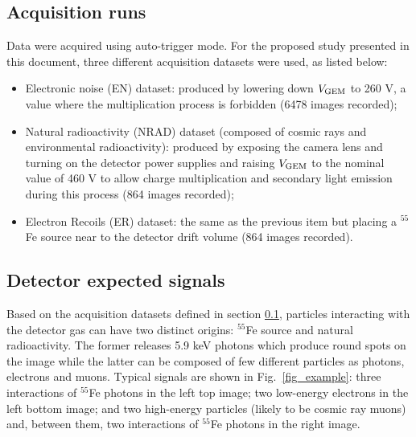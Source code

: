 \documentclass[a4paper,11pt]{article}
\begin{document}


\subsection{Acquisition runs}
\label{sec:acrRuns}

Data were acquired using auto-trigger mode. For the proposed study presented in this document, three different acquisition datasets were used, as listed below:

\begin{itemize}
    \item Electronic noise (EN) dataset: produced by lowering down $V\rm _{GEM}$ to 260 V, a value where the multiplication process is forbidden (6478 images recorded);
    \item Natural radioactivity (NRAD) dataset (composed of cosmic rays and environmental radioactivity): produced by exposing the camera lens and turning on the detector power supplies and raising $V\rm _{GEM}$ to the nominal value of 460 V to allow charge multiplication and secondary light emission during this process (864 images recorded);
    \item Electron Recoils (ER) dataset: the same as the previous item but placing a $^{55}$Fe source near to the detector drift volume (864 images recorded).
\end{itemize}


\subsection{Detector expected signals}

Based on the acquisition datasets defined in section \ref{sec:acrRuns}, particles interacting with the detector gas can have two distinct origins: $^{55}$Fe source and natural radioactivity. The former releases 5.9 keV photons which produce round spots on the image while the latter can be composed of few different particles as photons, electrons and muons. 
Typical signals are shown in  Fig.~\ref{fig_example}:
three interactions of $^{55}$Fe photons in the left top image; two low-energy electrons in the left bottom image; and two high-energy particles (likely to be cosmic ray muons) and, between them, two interactions of $^{55}$Fe photons in the right image.
\end{document}
